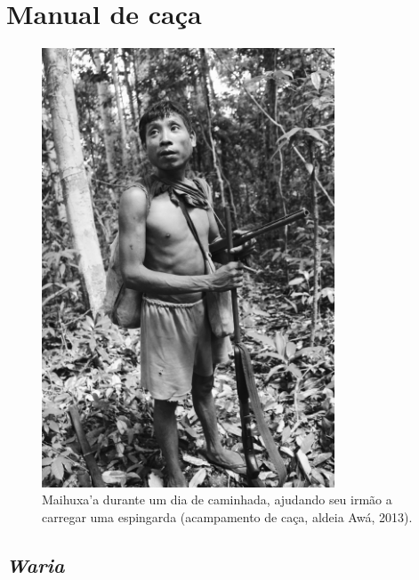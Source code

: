 
\chapter*{Manual de caça}\label{manual-de-cauxe7a}

\begin{figure}[H]
\centering
\captionsetup{width=87mm}
  \includegraphics[width=87mm]{./imgs/IMG_1553}
\caption{Maihuxa’a durante um dia de caminhada, ajudando seu irmão a carregar uma espingarda (acampamento de caça, aldeia Awá, 2013).}
\end{figure}

\section{\emph{Waria}}\label{waria}

